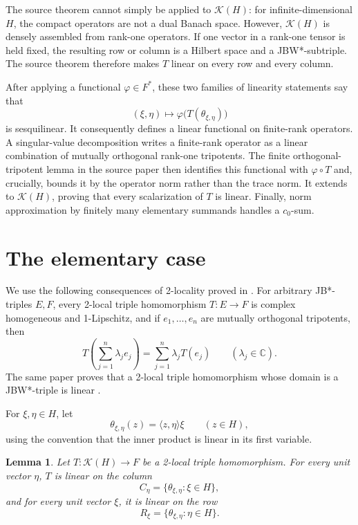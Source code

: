 \documentclass[11pt]{article}
\newtheorem{lemma}[theorem]{Lemma}
\theoremstyle{remark}
\newcommand{\K}{\mathcal K}
\newcommand{\C}{\mathbb C}
\begin{document}
The source theorem cannot simply be applied to $\K(H)$: for
infinite-dimensional $H$, the compact operators are not a dual Banach space.
However, $\K(H)$ is densely assembled from rank-one operators.  If one vector
in a rank-one tensor is held fixed, the resulting row or column is a Hilbert
space and a JBW*-subtriple.  The source theorem therefore makes $T$ linear on
every row and every column.

After applying a functional $\varphi\in F^*$, these two families of linearity
statements say that
\[
 (\xi,\eta)\longmapsto \varphi\bigl(T(\theta_{\xi,\eta})\bigr)
\]
is sesquilinear.  It consequently defines a linear functional on finite-rank
operators.  A singular-value decomposition writes a finite-rank operator as
a linear combination of mutually orthogonal rank-one tripotents.  The finite
orthogonal-tripotent lemma in the source paper then identifies this functional
with $\varphi\circ T$ and, crucially, bounds it by the operator norm rather
than the trace norm.  It extends to $\K(H)$, proving that every scalarization
of $T$ is linear.  Finally, norm approximation by finitely many elementary
summands handles a $c_0$-sum.

\section{The elementary case}

We use the following consequences of 2-locality proved in
\cite[Section 2]{BurgosEtAl}.  For arbitrary JB*-triples $E,F$, every
2-local triple homomorphism $T:E\to F$ is complex homogeneous and
1-Lipschitz, and if $e_1,\ldots,e_n$ are mutually orthogonal tripotents, then
\begin{equation}\label{eq:orthogonal}
 T\left(\sum_{j=1}^n\lambda_j e_j\right)
   =\sum_{j=1}^n\lambda_jT(e_j)
 \qquad(\lambda_j\in\C).
\end{equation}
The same paper proves that a 2-local triple homomorphism whose domain is a
JBW*-triple is linear \cite[Theorem 3.8]{BurgosEtAl}.

For $\xi,\eta\in H$, let
\[
 \theta_{\xi,\eta}(z)=\langle z,\eta\rangle\xi
 \qquad(z\in H),
\]
using the convention that the inner product is linear in its first variable.

\begin{lemma}\label{lem:rows-columns}
Let $T:\K(H)\to F$ be a 2-local triple homomorphism.  For every unit vector
$\eta$, $T$ is linear on the column
\[
 C_\eta=\{\theta_{\xi,\eta}:\xi\in H\},
\]
and for every unit vector $\xi$, it is linear on the row
\[
 R_\xi=\{\theta_{\xi,\eta}:\eta\in H\}.
\]
\end{lemma}
\end{document}
